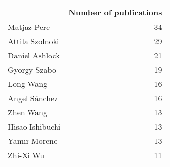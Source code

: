 \begin{tabular}{lr}
\toprule
{} &  Number of publications \\
\midrule
Matjaz Perc     &                      34 \\
Attila Szolnoki &                      29 \\
Daniel Ashlock  &                      21 \\
Gyorgy Szabo    &                      19 \\
Long Wang       &                      16 \\
Angel Sánchez   &                      16 \\
Zhen Wang       &                      13 \\
Hisao Ishibuchi &                      13 \\
Yamir Moreno    &                      13 \\
Zhi-Xi Wu       &                      11 \\
\bottomrule
\end{tabular}
